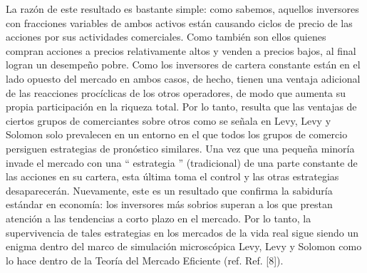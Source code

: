 \documentclass[12pt,a4paper]{article}
\begin{document}
\quad La razón de este resultado es bastante simple: como sabemos, aquellos inversores con fracciones variables de ambos activos están causando ciclos de precio de las acciones por sus actividades comerciales. Como también son ellos quienes compran acciones a precios relativamente altos y venden a precios bajos, al final logran un desempeño pobre. Como los inversores de cartera constante están en el lado opuesto del mercado en ambos casos, de hecho, tienen una ventaja adicional de las reacciones procíclicas de los otros operadores, de modo que aumenta su propia participación en la riqueza total. Por lo tanto, resulta que las ventajas de ciertos grupos de comerciantes sobre otros como se señala en Levy, Levy y Solomon solo prevalecen en un entorno en el que todos los grupos de comercio persiguen estrategias de pronóstico similares. Una vez que una pequeña minoría invade el mercado con una `` estrategia '' (tradicional) de una parte constante de las acciones en su cartera, esta última toma el control y las otras estrategias desaparecerán. Nuevamente, este es un resultado que confirma la sabiduría estándar en economía: los inversores más sobrios superan a los que prestan atención a las tendencias a corto plazo en el mercado. Por lo tanto, la supervivencia de tales estrategias en los mercados de la vida real sigue siendo un enigma dentro del marco de simulación microscópica Levy, Levy y Solomon como lo hace dentro de la Teoría del Mercado Eficiente (ref. Ref. [8]).
\end{document}
